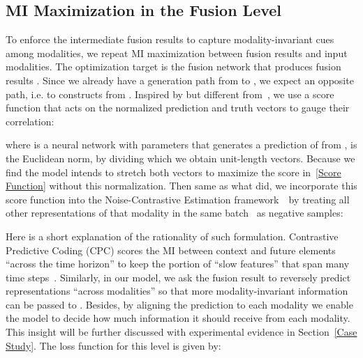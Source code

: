 \documentclass[11pt]{article}
\begin{document}
\subsection{MI Maximization in the Fusion Level} \label{CPC}
To enforce the intermediate fusion results to capture modality-invariant cues among modalities, we repeat MI maximization between fusion results and input modalities.
The optimization target is the fusion network  that produces  fusion results .
Since we already have a generation path from  to , we expect an opposite path, i.e. to constructs  from . Inspired by but different from~\citet{oord2018representation}, we use a score function that acts on the normalized prediction and truth vectors to gauge their correlation:

where  is a neural network with parameters  that generates a prediction of  from ,  is the Euclidean norm, by dividing which we obtain unit-length vectors.
Because we find the model intends to stretch both vectors to maximize the score in~\eqref{Score Function} without this normalization.
Then same as what \citet{oord2018representation} did, we incorporate this score function into the Noise-Contrastive Estimation framework~\citep{gutmann2010noise}~by treating all other representations of that modality in the same batch ~as negative samples:

Here is a short explanation of the rationality of such formulation.
Contrastive Predictive Coding (CPC) scores the MI between context and future elements ``across the time horizon'' to keep the portion of ``slow features'' that span many time steps~\citep{oord2018representation}.
Similarly, in our model, we ask the fusion result  to reversely predict representations ``across modalities'' so that more modality-invariant information can be passed to . 
Besides, by aligning the prediction to each modality we enable the model to decide how much information it should receive from each modality. 
This insight will be further discussed with experimental evidence in Section~\ref{Case Study}.
The loss function for this level is given by:
\end{document}
